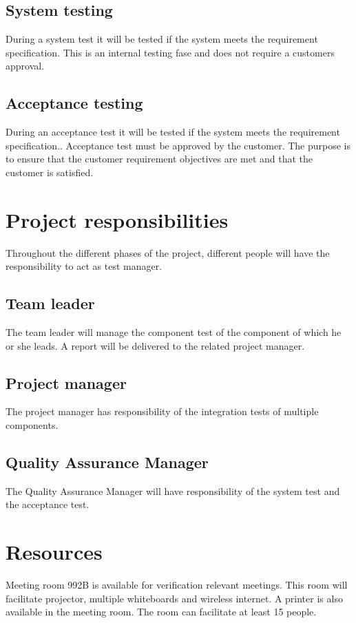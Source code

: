 \subsection{System testing}
During a system test it will be tested if the system meets the requirement specification. This is an internal testing fase and does not require a customers approval.

\subsection{Acceptance testing}
During an acceptance test it will be tested if the system meets the requirement specification.. Acceptance test must be approved by the customer. The purpose is to ensure that the customer requirement objectives are met and that the customer is satisfied.

\label{sec_projectresponsibilities}
\section{Project responsibilities}
Throughout the different phases of the project, different people will have the responsibility to act as test manager.


\subsection{Team leader}
The team leader will manage the component test of the component of which he or she leads. A report will be delivered to the related project manager.

\subsection{Project manager}
The project manager has responsibility of the integration tests of multiple components.

\subsection{Quality Assurance Manager}
The Quality Assurance Manager will have responsibility of the system test and the acceptance test. 


\section{Resources}
Meeting room 992B is available for verification relevant meetings. This room will facilitate projector, multiple whiteboards and wireless internet. A printer is also available in the meeting room. The room can facilitate at least 15 people.
 


